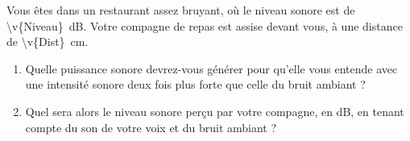 
Vous êtes dans un restaurant assez bruyant, où le niveau sonore est de \qty{\v{Niveau}}{dB}. Votre compagne de repas est assise devant vous, à une distance de \qty{\v{Dist}}{cm}.

\begin{enumerate}[label=\alph*)]
    \item Quelle puissance sonore devrez-vous générer pour qu'elle vous entende avec une intensité sonore deux fois plus forte que celle du bruit ambiant ?
    \item Quel sera alors le niveau sonore perçu par votre compagne, en dB, en tenant compte du son de votre voix et du bruit ambiant ?
\end{enumerate}